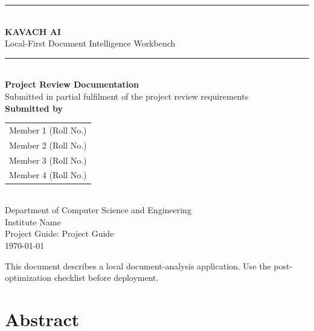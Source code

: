 \documentclass[11pt,a4paper]{article}
\newcommand{\projectname}{KAVACH AI}
\newcommand{\projecttagline}{Local-First Document Intelligence Workbench}
\newcommand{\memberA}{Member 1 (Roll No.)}
\newcommand{\memberB}{Member 2 (Roll No.)}
\newcommand{\memberC}{Member 3 (Roll No.)}
\newcommand{\memberD}{Member 4 (Roll No.)}
\newcommand{\institution}{Institute Name}
\newcommand{\department}{Department of Computer Science and Engineering}
\newcommand{\guidename}{Project Guide}
\newcommand{\reviewdate}{\today}
\begin{document}
\begin{titlepage}
\centering
\vspace*{1.2cm}

{\color{oxide}\rule{0.82\textwidth}{1.6pt}}\\[0.5cm]
{\Huge\bfseries\color{ink} \projectname}\\[0.35cm]
{\Large\color{ink!80} \projecttagline}\\[0.35cm]
{\color{oxide}\rule{0.82\textwidth}{1.6pt}}\\[1.6cm]

{\large\bfseries Project Review Documentation}\\[0.3cm]
{\large Submitted in partial fulfilment of the project review requirements}\\[1.8cm]

{\large\bfseries Submitted by}\\[0.4cm]
\begin{tabular}{c}
\memberA \\[2pt]
\memberB \\[2pt]
\memberC \\[2pt]
\memberD \\
\end{tabular}\\[1.6cm]

{\large \department}\\[0.25cm]
{\large \institution}\\[1.6cm]

{\large Project Guide: \guidename}\\[1.8cm]

{\large \reviewdate}

\vfill
{\footnotesize\color{ink!60} This document describes a local document-analysis application. Use the post-optimization checklist before deployment.}
\end{titlepage}

\section*{Abstract}
\end{document}
